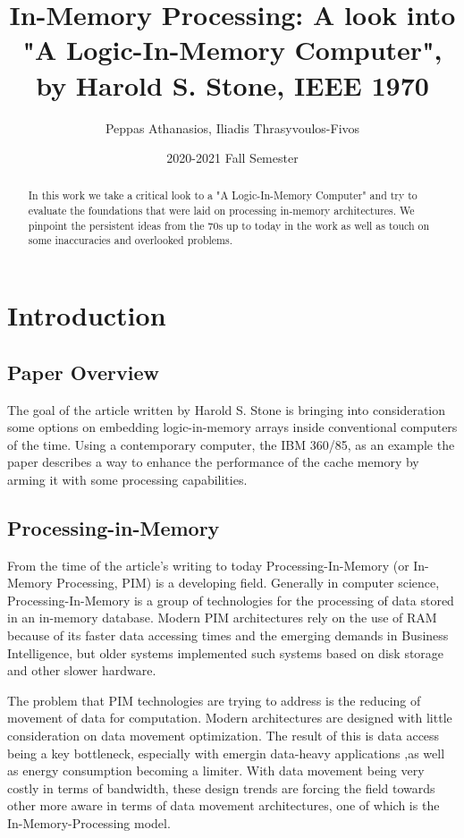 \documentclass[12pt,twocolumn]{IEEEtran}
\title{In-Memory Processing: A look into "A Logic-In-Memory Computer", by Harold S. Stone, IEEE 1970}
\date{2020-2021 Fall Semester}
\author{Peppas Athanasios, Iliadis Thrasyvoulos-Fivos}
\begin{document}
  \maketitle

\begin{abstract}
In this work we take a critical look to a "A Logic-In-Memory Computer" and try to evaluate the foundations that were laid on processing in-memory architectures. We pinpoint the persistent ideas from the 70s up to today in the work as well as touch on some inaccuracies and overlooked problems.
\end{abstract}

\section{Introduction}
\subsection{Paper Overview}
 The goal of the article written by Harold S. Stone is bringing into consideration some options on embedding logic-in-memory arrays inside conventional computers of the time. Using a contemporary computer, the IBM 360/85, as an example the paper describes a way to enhance the performance of the cache memory by arming it with some processing capabilities. 
\subsection{Processing-in-Memory}
From the time of the article's writing to today Processing-In-Memory (or In-Memory Processing, PIM)  is a developing field. Generally in computer science, Processing-In-Memory is a group of technologies for the processing of data stored in an in-memory database. Modern PIM architectures rely on the use of RAM because of its faster data accessing times and the emerging demands in Business Intelligence, but older systems implemented such systems based on disk storage and other slower hardware. 

The problem that PIM technologies are trying to address is the reducing of movement of data for computation. Modern architectures are designed with little consideration on data movement optimization. The result of this is data access being a key bottleneck, especially with emergin data-heavy applications ,as well as energy consumption becoming a limiter. With data movement being very costly in terms of bandwidth, these design trends are forcing the field towards other more aware in terms of data movement architectures, one of which is the In-Memory-Processing model.\cite{PAPER:1}
\end{document}
